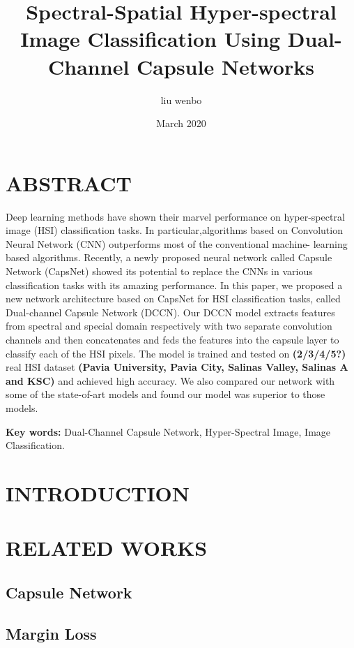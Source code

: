 \documentclass{article}
\title{Spectral-Spatial Hyper-spectral Image Classification Using Dual-Channel Capsule Networks}
\author{liu wenbo}
\date{March 2020}
\begin{document}
	\maketitle


	\section{ABSTRACT}\label{sec:abstract}
	Deep learning methods have shown their marvel performance on hyper-spectral image (HSI) classification tasks.
	In particular,algorithms based on Convolution Neural Network (CNN) outperforms most of the conventional machine-
	learning based algorithms.
	Recently, a newly proposed neural network called Capsule Network (CapsNet) showed its potential to replace the CNNs
	in various classification tasks with its amazing performance.
	In this paper, we proposed a new network architecture based on CapsNet for HSI classification tasks, called
	Dual-channel Capsule Network (DCCN).
	Our DCCN model extracts features from spectral and special domain respectively with two separate convolution
	channels and then concatenates and feds the features into the capsule layer to classify each of the HSI pixels.
	The model is trained and tested on \textbf{(2/3/4/5?)} real HSI dataset \textbf{(Pavia University, Pavia City,
	Salinas Valley, Salinas A and KSC)} and achieved high accuracy.
	We also compared our network with some of the state-of-art models and found our model was superior to those models.

	\textbf{Key words:} Dual-Channel Capsule Network, Hyper-Spectral Image, Image Classification.


	\section{INTRODUCTION}\label{sec:introduction}


	\section{RELATED WORKS}\label{sec:related-works}

	\subsection{Capsule Network}\label{subsec:capsule-network}

	\subsection{Margin Loss}\label{subsec:margin-loss}
\end{document}
